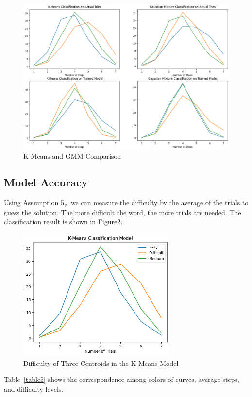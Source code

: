 \documentclass[12pt]{article}
\begin{document}
\begin{figure}[h]
    \centering
    \includegraphics[h]{figures/clustering.png}
    \caption{K-Means and GMM Comparison}
    \label{clustering}
\end{figure}

\subsection{Model Accuracy}
Using Assumption 5，we can measure the difficulty by the average of the trials to guess the solution. The more difficult the word, the more trials are needed. The classification result is shown in Figure\ref{kmeans}.

\begin{figure}[h]
    \centering
    \includegraphics[width=8cm]{figures/kmeans.png}
    \caption{Difficulty of Three Centroids in the K-Means Model}
    \label{kmeans}
\end{figure}

\vspace{0.3cm}
\noindent
Table~\ref{table5} shows the correspondence among colors of curves, average steps, and difficulty levels.
\end{document}
